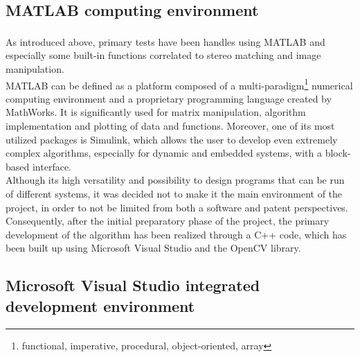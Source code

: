 \subsection{MATLAB computing environment}
\label{subsection:matlab-env}
As introduced above, primary tests have been handles using MATLAB\textsuperscript{\textregistered} and especially some built-in functions correlated to stereo matching and image manipulation.\\
MATLAB can be defined as a platform composed of a multi-paradigm\footnote{functional, imperative, procedural, object-oriented, array} numerical computing environment and a proprietary programming language created by MathWorks.
It is significantly used for matrix manipulation, algorithm implementation and plotting of data and functions.
Moreover, one of its most utilized packages is Simulink, which allows the user to develop even extremely complex algorithms, especially for dynamic and embedded systems, with a block-based interface. \\
Although its high versatility and possibility to design programs that can be run of different systems, it was decided not to make it the main environment of the project, in order to not be limited from both a software and patent perspectives.\\
Consequently, after the initial preparatory phase of the project, the primary development of the algorithm has been realized through a C++ code, which has been built up using Microsoft Visual Studio and the OpenCV library. 

\subsection{Microsoft Visual Studio integrated development environment}
\label{subsection:visual-studio-env}

